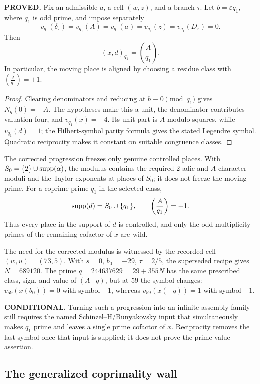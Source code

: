 \begin{proposition}
\textbf{PROVED.}  Fix an admissible $a$, a cell $(w,z)$, and a branch
$\tau$.  Let $b=\varepsilon q_1$, where $q_1$ is odd prime, and impose separately
\[
 v_{q_1}(\delta_\tau)=v_{q_1}(A)=v_{q_1}(a)
 =v_{q_1}(z)=v_{q_1}(D_z)=0.
\]
Then
\[
 (x,d)_{q_1}=\left(\frac{A}{q_1}\right).
\]
In particular, the moving place is aligned by choosing a residue class
with $\left(\frac{A}{q_1}\right)=+1$.
\end{proposition}

\begin{proof}
Clearing denominators and reducing at $b\equiv0\pmod{q_1}$ gives
$N_g(0)=-A$.  The hypotheses make this a unit, the denominator
contributes valuation four, and $v_{q_1}(x)=-4$.  Its unit part is
$A$ modulo squares, while $v_{q_1}(d)=1$; the Hilbert-symbol parity
formula gives the stated Legendre symbol.  Quadratic reciprocity makes
it constant on suitable congruence classes.
\end{proof}

The corrected progression freezes only genuine controlled places.
With $S_0=\{2\}\cup\operatorname{supp}(\alpha)$, the modulus contains the required
$2$-adic and $A$-character moduli and the Taylor exponents at places of
$S_0$; it does not freeze the moving prime.  For a coprime prime
$q_1$ in the selected class,
\[
 \operatorname{supp}(d)=S_0\cup\{q_1\},
 \qquad \left(\frac{A}{q_1}\right)=+1.
\]
Thus every place in the support of $d$ is controlled, and only the
odd-multiplicity primes of the remaining cofactor of $x$ are wild.

The need for the corrected modulus is witnessed by the recorded cell
$(w,u)=(73,5)$.  With $s=0$, $b_0=-29$, $\tau=2/5$, the superseded
recipe gives
$N=689120$.  The prime $q=244637629=29+355N$ has the same prescribed
class, sign, and value of $(A\mid q)$, but at $59$ the symbol changes:
$v_{59}(x(b_0))=0$ with symbol $+1$, whereas
$v_{59}(x(-q))=1$ with symbol $-1$.

\textbf{CONDITIONAL.}  Turning such a progression into an infinite
assembly family still requires the named Schinzel--H/Bunyakovsky input
that simultaneously makes $q_1$ prime and leaves a single prime
cofactor of $x$.  Reciprocity removes the last symbol once that input
is supplied; it does not prove the prime-value assertion.

\subsection{The generalized coprimality wall}

